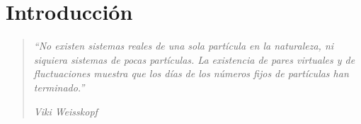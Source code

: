 \documentclass[a4paper,11pt]{book} %
\begin{document}

\tableofcontents %
\newpage

\chapter{Introducción}
\begin{quote}
\textit{``No existen sistemas reales de una sola partícula en la naturaleza, ni siquiera 
sistemas de pocas partículas. La existencia de pares virtuales y de fluctuaciones muestra que los días de los números fijos de partículas han terminado.''}
\begin{flushright}
\textit{Viki Weisskopf}
\end{flushright}
\end{quote}
\end{document}
